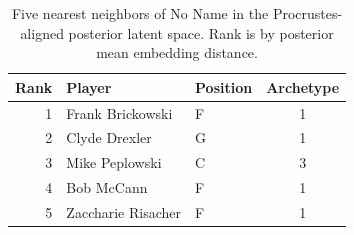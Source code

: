 \begin{table}[htbp]
  \centering\small
  \begin{tabular}{rllc}
    \toprule
    Rank & Player & Position & Archetype \\
    \midrule
    1 & Frank Brickowski & F & 1 \\
    2 & Clyde Drexler & G & 1 \\
    3 & Mike Peplowski & C & 3 \\
    4 & Bob McCann & F & 1 \\
    5 & Zaccharie Risacher & F & 1 \\
    \bottomrule
  \end{tabular}
  \caption{Five nearest neighbors of No Name in the Procrustes-aligned posterior latent space. Rank is by posterior mean embedding distance.}
  \label{tab:No_Name_neighbors}
\end{table}

